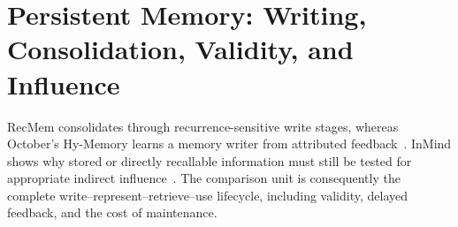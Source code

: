 \chapter{Persistent Memory: Writing, Consolidation, Validity, and Influence}\label{ch:C14}

RecMem consolidates through recurrence-sensitive write stages, whereas October's Hy-Memory learns a memory writer from attributed feedback~\cite{dai2026recmem,fei2026hymemory}. InMind shows why stored or directly recallable information must still be tested for appropriate indirect influence~\cite{inmind2026}. The comparison unit is consequently the complete write--represent--retrieve--use lifecycle, including validity, delayed feedback, and the cost of maintenance.









